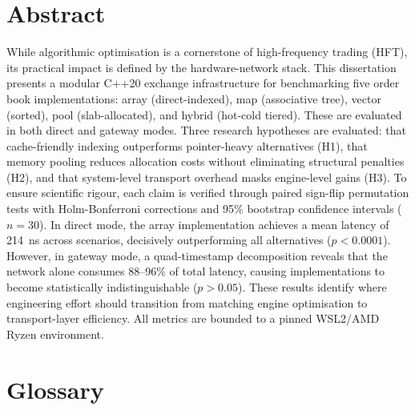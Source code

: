 \documentclass[12pt,a4paper]{report}
\begin{document}
\chapter*{Abstract}
While algorithmic optimisation is a cornerstone of high-frequency trading (HFT), 
its practical impact is defined by the hardware-network stack. This dissertation 
presents a modular C++20 exchange infrastructure for benchmarking five order 
book implementations: array (direct-indexed), map (associative tree), vector 
(sorted), pool (slab-allocated), and hybrid (hot-cold tiered). These are 
evaluated in both direct and gateway modes. Three research hypotheses are 
evaluated: that cache-friendly indexing outperforms pointer-heavy alternatives 
(H1), that memory pooling reduces allocation costs without eliminating 
structural penalties (H2), and that system-level transport overhead masks 
engine-level gains (H3). To ensure scientific rigour, each claim is verified 
through paired sign-flip permutation tests with Holm-Bonferroni 
corrections and 95\% bootstrap confidence intervals ($n=30$). In direct 
mode, the array implementation achieves a mean latency of 214~ns across 
scenarios, decisively outperforming all alternatives ($p<0.0001$). 
However, in gateway mode, a quad-timestamp decomposition reveals 
that the network alone consumes 88--96\% of total latency, causing 
implementations to become statistically indistinguishable ($p > 0.05$). 
These results identify where engineering effort should transition from 
matching engine optimisation to transport-layer efficiency. 
All metrics are bounded to a pinned WSL2/AMD Ryzen environment.

\clearpage
{}









{\raggedright
\sloppy

}

\appendix

\chapter{Glossary}
\label{app:glossary}
\end{document}
